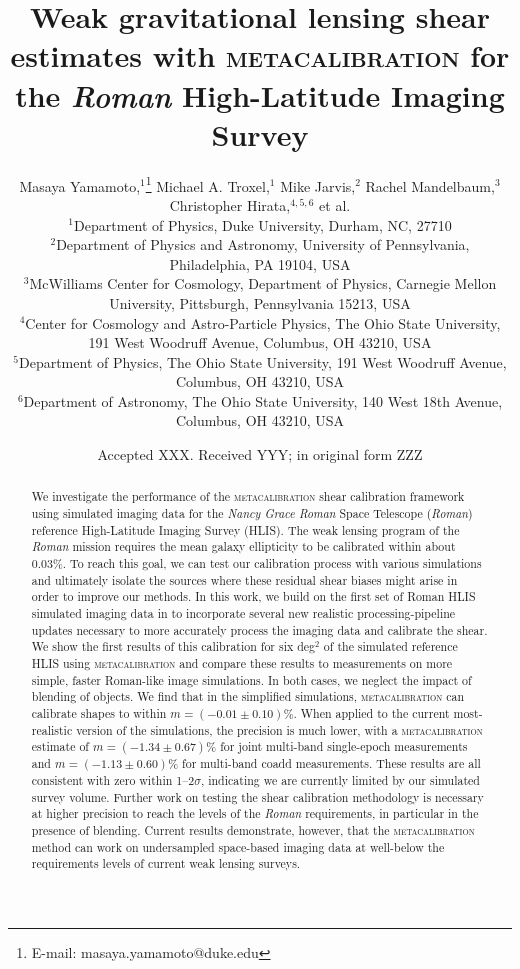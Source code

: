 \documentclass[fleqn,usenatbib]{mnras}
\title[Metacalibration for the Roman High-Latitude Imaging Survey]{Weak gravitational lensing shear estimates with \textsc{metacalibration} for the \emph{Roman} High-Latitude Imaging Survey}
\author[M. Yamamoto et al.]{
Masaya Yamamoto,$^{1}$\thanks{E-mail: masaya.yamamoto@duke.edu}
Michael A. Troxel,$^{1}$
Mike Jarvis,$^{2}$
Rachel Mandelbaum,$^{3}$
Christopher Hirata,$^{4,5,6}$
 et al.\\
$^{1}$Department of Physics, Duke University, Durham, NC, 27710\\
$^{2}$Department of Physics and Astronomy, University of Pennsylvania, Philadelphia, PA 19104, USA\\
$^{3}$McWilliams Center for Cosmology, Department of Physics, Carnegie Mellon University, Pittsburgh, Pennsylvania 15213, USA\\
$^{4}$Center for Cosmology and Astro-Particle Physics, The Ohio State University, 191 West Woodruff Avenue, Columbus, OH 43210, USA\\
$^{5}$Department of Physics, The Ohio State University, 191 West Woodruff Avenue, Columbus, OH 43210, USA\\
$^{6}$Department of Astronomy, The Ohio State University, 140 West 18th Avenue, Columbus, OH 43210, USA\\
}
\date{Accepted XXX. Received YYY; in original form ZZZ}
\begin{document}
\label{firstpage}
\pagerange{\pageref{firstpage}--\pageref{lastpage}}
\maketitle

\begin{abstract}
We investigate the performance of the \textsc{metacalibration} shear calibration framework using simulated imaging data for the \emph{Nancy Grace Roman} Space Telescope (\emph{Roman}) reference High-Latitude Imaging Survey (HLIS). 
The weak lensing program of the \emph{Roman} mission requires the mean galaxy ellipticity to be calibrated within about 0.03\%. To reach this goal, we can test our calibration process with various simulations and ultimately isolate the sources where these residual shear biases might arise in order to improve our methods. In this work, we build on the first set of Roman HLIS simulated imaging data in \cite{2021MNRAS.501.2044T} to incorporate several new realistic processing-pipeline updates necessary to more accurately process the imaging data and calibrate the shear. We show the first results of this calibration for six deg$^{2}$ of the simulated reference HLIS using \textsc{metacalibration} and compare these results to measurements on more simple, faster Roman-like image simulations. In both cases, we neglect the impact of blending of objects. We find that in the simplified simulations, \textsc{metacalibration} can calibrate shapes to within $m=(-0.01\pm 0.10)$\%. When applied to the current most-realistic version of the simulations, the precision is much lower, with a \textsc{metacalibration} estimate of $m=(-1.34\pm 0.67)$\% for joint multi-band single-epoch measurements and $m=(-1.13\pm 0.60)$\% for multi-band coadd measurements. These results are all consistent with zero within 1--2$\sigma$, indicating we are currently limited by our simulated survey volume. Further work on testing the shear calibration methodology is necessary at higher precision to reach the levels of the \textit{Roman} requirements, in particular in the presence of blending. 
Current results demonstrate, however, that the \textsc{metacalibration} method can work on undersampled space-based imaging data at well-below the requirements levels of current weak lensing surveys.
\end{abstract}
\end{document}
